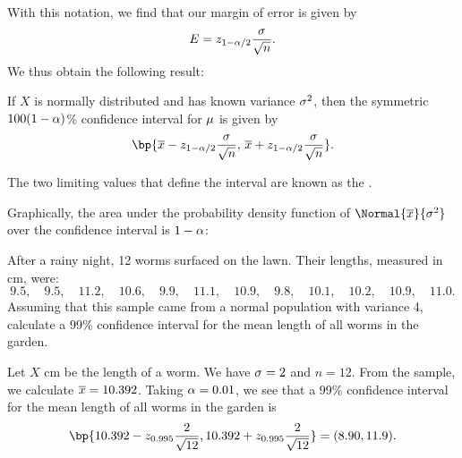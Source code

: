 With this notation, we find that our margin of error is given by \[E = z_{1 - \alpha/2} \frac{\sigma}{\sqrt{n}}.\] We thus obtain the following result:

\begin{proposition}
    If $X$ is normally distributed and has known variance $\sigma^2$, then the symmetric $100(1-\alpha)$\% confidence interval for $\mu$ is given by \[\bp{\ol{x} - z_{1 - \a/2} \frac{\s}{\sqrt{n}}, \, \ol{x} + z_{1 - \a/2} \frac{\s}{\sqrt{n}}}.\]
\end{proposition}

The two limiting values that define the interval are known as the .

Graphically, the area under the probability density function of $\Normal{\ol{x}}{\s^2}$ over the confidence interval is $1 - \alpha$:

\begin{figure}[H]
    \centering
    \caption{}
\end{figure}

\begin{sample}
    After a rainy night, 12 worms surfaced on the lawn. Their lengths, measured in cm, were: \[9.5, \quad 9.5, \quad 11.2, \quad 10.6, \quad 9.9, \quad 11.1, \quad 10.9, \quad 9.8, \quad 10.1, \quad 10.2, \quad 10.9, \quad 11.0.\] Assuming that this sample came from a normal population with variance 4, calculate a 99\% confidence interval for the mean length of all worms in the garden.
\end{sample}
\begin{sampans}
    Let $X$ cm be the length of a worm. We have $\sigma = 2$ and $n = 12$. From the sample, we calculate $\overline{x} = 10.392$. Taking $\alpha = 0.01$, we see that a 99\% confidence interval for the mean length of all worms in the garden is \[\bp{10.392 - z_{0.995} \frac{2}{\sqrt{12}}, 10.392 + z_{0.995} \frac{2}{\sqrt{12}}} = (8.90, 11.9).\]
\end{sampans}

